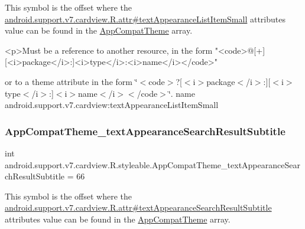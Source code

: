 This symbol is the offset where the \hyperlink{classandroid_1_1support_1_1v7_1_1cardview_1_1R_1_1attr_a597866d38e854d681b09252165dda349}{android.\+support.\+v7.\+cardview.\+R.\+attr\#text\+Appearance\+List\+Item\+Small} attribute\textquotesingle{}s value can be found in the \hyperlink{classandroid_1_1support_1_1v7_1_1cardview_1_1R_1_1styleable_a52e6f69f954ecc2622d72c0b4d298938}{App\+Compat\+Theme} array.

\begin{DoxyVerb}      <p>Must be a reference to another resource, in the form "<code>@[+][<i>package</i>:]<i>type</i>:<i>name</i></code>"
\end{DoxyVerb}
 or to a theme attribute in the form \char`\"{}$<$code$>$?\mbox{[}$<$i$>$package$<$/i$>$\+:\mbox{]}\mbox{[}$<$i$>$type$<$/i$>$\+:\mbox{]}$<$i$>$name$<$/i$>$$<$/code$>$\char`\"{}.  name android.\+support.\+v7.\+cardview\+:text\+Appearance\+List\+Item\+Small \mbox{\label{classandroid_1_1support_1_1v7_1_1cardview_1_1R_1_1styleable_a5c6429ab74191c03ded7047f5aa85f30}} 
\subsubsection{\texorpdfstring{App\+Compat\+Theme\+\_\+text\+Appearance\+Search\+Result\+Subtitle}{AppCompatTheme\_textAppearanceSearchResultSubtitle}}
{\footnotesize\ttfamily int android.\+support.\+v7.\+cardview.\+R.\+styleable.\+App\+Compat\+Theme\+\_\+text\+Appearance\+Search\+Result\+Subtitle = 66\hspace{0.3cm}{\ttfamily [static]}}

This symbol is the offset where the \hyperlink{classandroid_1_1support_1_1v7_1_1cardview_1_1R_1_1attr_ab3920ecf71a4a5679ad0ce89fc417104}{android.\+support.\+v7.\+cardview.\+R.\+attr\#text\+Appearance\+Search\+Result\+Subtitle} attribute\textquotesingle{}s value can be found in the \hyperlink{classandroid_1_1support_1_1v7_1_1cardview_1_1R_1_1styleable_a52e6f69f954ecc2622d72c0b4d298938}{App\+Compat\+Theme} array.

